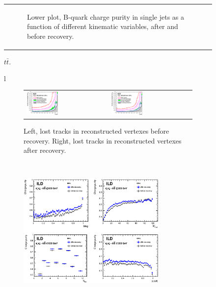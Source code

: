 \documentclass[preprint]{elsarticle}
\begin{document}
\begin{itemize}
\begin{figure}[!ht]
\begin{tabular}{l}
\begin{subfigure}{\textwidth}
      \caption{Lower plot, B-quark charge purity in single jets as a function of different kinematic variables, after and before recovery.}
      \label{vr_and_bquarkpurity_ttbar:b}
    \end{subfigure}%
  \end{tabular}
  \caption{$t\bar{t}$.  }
  \label{vr_and_bquarkpurity_ttbar}
\end{figure}


\begin{figure}[!ht]
  \centering
  \begin{tabular}{l}
    \begin{subfigure}{\textwidth}
      \centering
      \begin{tabular}{ll}
        \centering
        \includegraphics[width=0.4\textwidth]{figures_Methods/beforeVR_bbbar_l5.eps} & \includegraphics[width=0.4\textwidth]{figures_Methods/afterVR_bbbar_l5.eps}\\
      \end{tabular}
      \caption{ Left, lost tracks in reconstructed vertexes before recovery. Right, lost tracks in reconstructed vertexes after recovery.}
      \label{vr_and_bquarkpurity_bbbar:a}
    \end{subfigure} \\
    \begin{subfigure}{\textwidth}
      \centering
      \includegraphics[width=0.8\textwidth]{figures_Methods/b_purity_VR_bbbar_l5.eps}

\end{subfigure}
\end{tabular}
\end{figure}
\end{itemize}
\end{document}
